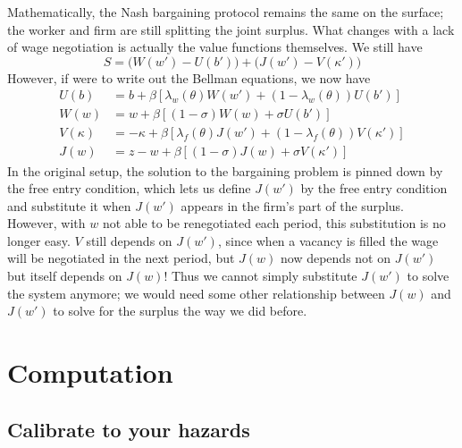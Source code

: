 \documentclass[12pt, letterpaper, parskip = full]{article}
\begin{document}
	Mathematically, the Nash bargaining protocol remains the same on the surface; the worker and firm are still splitting the joint surplus. What changes with a lack of wage negotiation is actually the value functions themselves. We still have
	\[ S = \Big(W(w') - U(b')\Big) + \Big(J(w') - V(\kappa')\Big)  \]
	However, if were to write out the Bellman equations, we now have
\begin{align*}
	U(b) &= b + \beta \left[\lambda_w(\theta) W(w') + (1 - \lambda_w(\theta)) U(b')\right]\\
	W(w) &= w + \beta \left[(1 - \sigma) W(w) + \sigma U(b')\right]\\
	V(\kappa) &= - \kappa + \beta \left[\lambda_f(\theta) J(w') + (1 - \lambda_f(\theta)) V(\kappa')\right]\\
	J(w) &= z - w + \beta \left[(1-\sigma) J(w) + \sigma V(\kappa')\right]
	\end{align*}
	In the original setup, the solution to the bargaining problem is pinned down by the free entry condition, which lets us define \(J(w')\) by the free entry condition and substitute it when \(J(w')\) appears in the firm's part of the surplus. However, with \(w\) not able to be renegotiated each period, this substitution is no longer easy. \(V\) still depends on \(J(w')\), since when a vacancy is filled the wage will be negotiated in the next period, but \(J(w)\) now depends not on \(J(w')\) but itself depends on \(J(w)\)! Thus we cannot simply substitute \(J(w')\) to solve the system anymore; we would need some other relationship between \(J(w)\) and \(J(w')\) to solve for the surplus the way we did before.

	\section{Computation}

	\subsection{Calibrate to your hazards}
	
\end{document}
